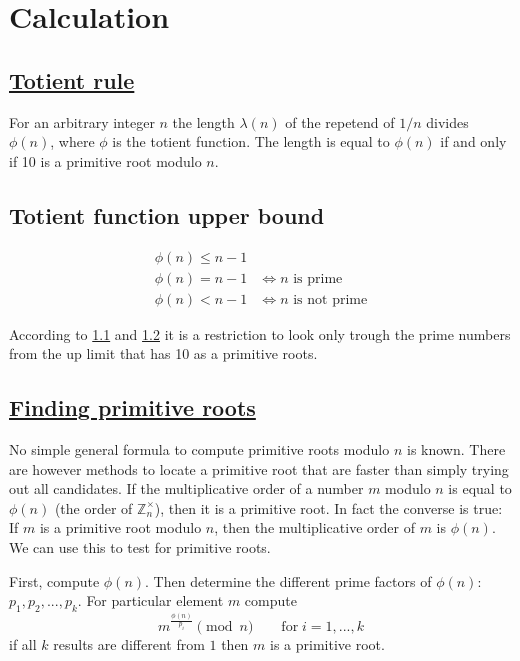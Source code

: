 \documentclass{article}
\begin{document}
\section{Calculation}
\subsection{\href{https://en.wikipedia.org/wiki/Repeating_decimal\#Totient_rule}{Totient rule}} \label{totient_rule}
For an arbitrary integer $n$ the length  $\lambda (n)$ of the repetend of $1/n$ 
divides $\phi (n)$, where $\phi$  is the totient function. 
The length is equal to $\phi (n)$ if and only if 10 is a primitive root modulo $n$.

\subsection{Totient function upper bound} \label{totient_function_upper_bound}
\begin{align*}
        \phi(n) \le n - 1 & \\
        \phi(n) = n - 1  & \iff n \text{ is prime} \\
        \phi(n) < n - 1  & \iff n \text{ is not prime}
\end{align*}

According to  \ref{totient_rule} and \ref{totient_function_upper_bound} it is a 
restriction to look only trough the prime numbers from the up limit that has 10 
as a primitive roots.

\subsection{\href{https://en.wikipedia.org/wiki/Primitive_root_modulo_n\#Finding_primitive_roots}{Finding primitive roots}}
No simple general formula to compute primitive roots modulo $n$ is known. 
There are however methods to locate a primitive root that are faster than simply 
trying out all candidates. If the multiplicative order of a number $m$ modulo $n$ 
is equal to $\phi(n)$ (the order of $\mathbb{Z}_n^\times$), then it is a primitive root. 
In fact the converse is true: If $m$ is a primitive root modulo $n$, then the 
multiplicative order of $m$ is $\phi(n)$. We can use this to test for primitive roots.

First, compute $\phi(n)$. Then determine the different prime factors of $\phi(n)$:
$p_1,p_2,...,p_k$. For particular element $m$ compute
\begin{equation*}
    m^{\frac{\phi(n)}{p_i}} \pmod{n} \qquad \text{for} \; i = 1,...,k
\end{equation*}
if all $k$ results are different from $1$ then $m$ is a primitive root.
\newpage
\end{document}

